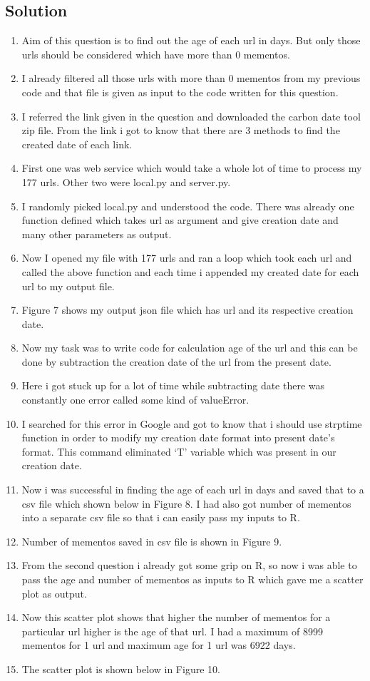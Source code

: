 \subsection{Solution}
\begin{enumerate}

\item Aim of this question is to find out the age of each url in days. But only those urls should be considered which have more than 0 mementos.
\item I already filtered all those urls with more than 0 mementos from my previous code and that file is given as input to the code written for this question. 
\item I referred the link given in the question and downloaded the carbon date tool zip file. From the link i got to know that there are 3 methods to find the created date of each link.
\item First one was web service which would take a whole lot of time to process my 177 urls. Other two were local.py and server.py.
\item I randomly picked local.py and understood the code. There was already one function defined which takes url as argument and give creation date and many other parameters as output.
\item Now I opened my file with 177 urls and ran a loop which took each url and called the above function and each time i appended my created date for each url to my output file.
\item Figure 7 shows my output json file which has url and its respective creation date. 
\item Now my task was to write code for calculation age of the url and this can be done by subtraction the creation date of the url from the present date.
\item Here i got stuck up for a lot of time while subtracting date there was constantly one error called some kind of valueError. 
\item I searched for this error in Google and got to know that i should use strptime function in order to modify my creation date format into present date's format. This command eliminated `T' variable which was present in our creation date.
\item Now i was successful in finding the age of each url in days and saved that to a csv file which shown below in Figure 8. I had also got number of mementos into a separate csv file so that i can easily pass my inputs to R.
\item Number of mementos saved in csv file is shown in Figure 9.
\item From the second question i already got some grip on R, so now i was able to pass the age and number of mementos as inputs to R which gave me a scatter plot as output.
\item Now this scatter plot shows that higher the number of mementos for a particular url higher is the age of that url. I had a maximum of 8999 mementos for 1 url and maximum age for 1 url was 6922 days.
\item The scatter plot is shown below in Figure 10.
\end{enumerate}
\newpage

